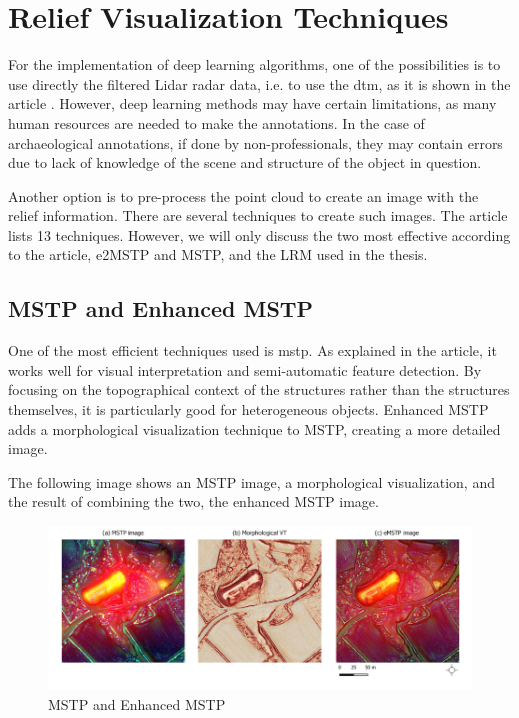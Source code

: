 \section{Relief Visualization Techniques}

For the implementation of deep learning algorithms, one of the possibilities is to use directly the filtered Lidar radar data, i.e. to use the \ac{dtm}, as it is shown in the article \cite{deeplearningRawLidarData}. However, deep learning methods may have certain limitations, as many human resources are needed to make the annotations. In the case of archaeological annotations, if done by non-professionals, they may contain errors due to lack of knowledge of the scene and structure of the object in question. 

Another option is to pre-process the point cloud to create an image with the relief information. There are several techniques to create such images. The article \cite{reliefModel} lists 13 techniques. However, we will only discuss the two most effective according to the article, e2MSTP and MSTP, and the LRM used in the thesis.

\subsection{MSTP and Enhanced MSTP}
One of the most efficient techniques used is \ac{mstp}. As explained in the \cite{mstp} article, it works well for visual interpretation and semi-automatic feature detection. By focusing on the topographical context of the structures rather than the structures themselves, it is particularly good for heterogeneous objects. Enhanced MSTP adds a morphological visualization technique to MSTP, creating a more detailed image.

The following image shows an MSTP image, a morphological visualization, and the result of combining the two, the enhanced MSTP image.

\begin{figure}[H]
\centering
\includegraphics[width=12cm]{figs/mstp.png}
\caption{MSTP and Enhanced MSTP \cite{emstp}}
\end{figure}

